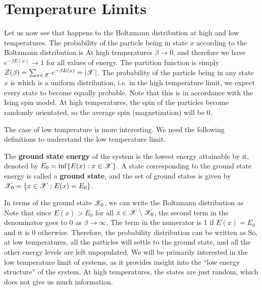 \documentclass[letterpaper,english,10pt]{article}
\begin{document}
\section{Temperature Limits}
Let us now see that happens to the Boltzmann distribution at high and low temperatures. 
The probability of the particle being in state $x$ according to the Boltzmann distribution is 
At high temperatures $\beta \to 0$, and therefore we have $e^{-\beta E(x)} \to 1$ for all values of energy. 
The partition function is simply $Z(\beta)=\sum_{x \in \mathscr{X}} e^{-\beta E(x)}=| \mathscr{X} |$. The probability of the particle being in any state $x$ is 
which is a uniform distribution, i.e. in the high temperature limit, we expect every state to become equally probable. 
Note that this is in accordance with the Ising spin model. 
At high temperatures, the spin of the particles become randomly orientated, so the average spin (magnetization) will be $0$. 

The case of low temperature is more interesting. 
We need the following definitions to understand the low temperature limit. 
\begin{defn}
The \textbf{ground state energy} of the system is the lowest energy attainable by it, denoted by $E_0 = \inf\{E(x): x \in \mathscr{X}\}$. 
A state corresponding to the ground state energy is called a \textbf{ground state}, 
and the set of ground states is given by $\mathscr{X}_0 = \left\{x \in \mathscr{X}: E(x) = E_0\right\}$. 
\end{defn}
In terms of the ground state $\mathscr{X}_0$, we can write the Boltzmann distribution as 
Note that since $E(x)>E_0$ for all $x \in \mathscr{X} \setminus \mathscr{X}_0$, the second term in the denominator goes to 0 as $\beta \to \infty$. The term in the numerator is 1 if $E(x)=E_0$ and it is 0 otherwise. 
Therefore, the probability distribution can be written as 
So, at low temperatures, all the particles will settle to the ground state, and all the other energy levels are left unpopulated. 
We will be primarily interested in the low temperature limit of systems, as it provides insight into the ``low energy structure'' of the system. 
At high temperatures, the states are just random, which does not give us much information.  
\end{document}
